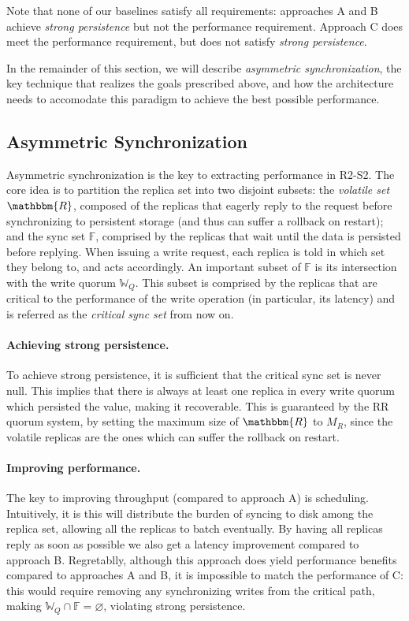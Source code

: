 Note that none of our baselines satisfy all requirements:
approaches A and B achieve
\emph{strong persistence} but not the performance requirement.
Approach C does meet the performance
requirement, but does not satisfy \emph{strong persistence}.

In the remainder of this section, we will describe
\emph{asymmetric synchronization}, the key technique that realizes the
goals prescribed above, and how the architecture needs to
accomodate this paradigm to achieve the best possible
performance.

\subsection{Asymmetric Synchronization}\label{ssec:asymmetric_synchronization}

Asymmetric synchronization is the key to extracting performance
in \ac{R2-S2}. The core idea is to partition the replica set
into two disjoint subsets: the \emph{volatile set}
$\mathbbm{R}$, composed of the replicas that eagerly reply to the
request before synchronizing to persistent storage (and thus can
suffer a rollback on restart); and the sync set $\mathbb{F}$,
comprised by the
replicas that wait until the data is persisted before replying.
When issuing a write request, each replica is told in which set
they belong to, and acts accordingly. An important subset of
$\mathbb{F}$ is its intersection with the write quorum
$\mathbb{W}_Q$. This subset is comprised by the replicas that are
critical to the performance of the write operation (in
particular, its latency) and is referred as the \emph{critical
sync set} from now on.

\paragraph{Achieving strong persistence.} To achieve strong
persistence, it is sufficient that the critical sync set is
never null. This implies that there is always at least one
replica in every write quorum which persisted the value, making
it recoverable. This is guaranteed by the \ac{RR} quorum
system, by setting the maximum size of $\mathbbm{R}$ to $M_R$,
since the volatile replicas are the ones which can suffer the rollback on
restart.

\paragraph{Improving performance.}The key to improving throughput
(compared to approach A) is scheduling. Intuitively, it is
this will distribute the burden of syncing to disk among the
replica set, allowing all the replicas to batch eventually. By
having all replicas reply as soon as possible we also get a
latency improvement compared to approach B. Regretablly, although
this approach does yield performance benefits compared to
approaches A and B, it is impossible to match the performance of
C\@: this would require removing any synchronizing writes from the
critical path, making $\mathbb{W}_Q \cap \mathbb{F} =
\varnothing$, violating strong persistence.

